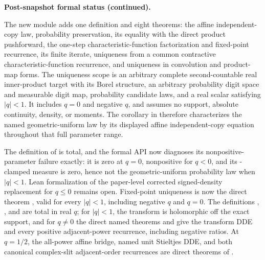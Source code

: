\documentclass[11pt]{article}
\numberwithin{equation}{section}
\theoremstyle{definition}
\theoremstyle{remark}
\begin{document}
\begin{boxedremark}
\textbf{Post-snapshot formal status (continued).}

The new module  adds one definition and eight theorems:
the affine independent-copy law, probability preservation, its equality with the direct
product pushforward, the one-step characteristic-function factorization and fixed-point
recurrence, its finite iterate, uniqueness from a common contractive characteristic-function
recurrence, and uniqueness in convolution and product-map forms.  The uniqueness scope is
an arbitrary complete second-countable real inner-product target with its Borel structure,
an arbitrary probability digit space and measurable digit map, probability candidate laws,
and a real scalar satisfying \(|q|<1\).  It includes \(q=0\) and negative \(q\), and assumes
no support, absolute continuity, density, or moments.  The corollary
 in
 therefore characterizes the named geometric-uniform
law by its displayed affine independent-copy equation throughout that full parameter range.

The definition of  is total, and the formal API now diagnoses
its nonpositive-parameter failure exactly: it is zero at \(q=0\), nonpositive for \(q<0\),
and its -clamped  measure is zero, hence not the
geometric-uniform probability law when \(|q|<1\).  Lean formalization of the paper-level
corrected signed-density replacement for \(q\le0\) remains open.  Fixed-point uniqueness is
now the direct theorem
, valid for every
\(|q|<1\), including negative \(q\) and \(q=0\).  The definitions
,
, and
 are total in real \(q\); for \(|q|<1\), the transform
is holomorphic off the exact support, and for \(q\ne0\) the direct named theorems
 and
 give the transform DDE and every positive
adjacent-power recurrence, including negative ratios.  At \(q=1/2\), the all-power affine
bridge, named unit Stieltjes DDE, and both canonical complex-slit adjacent-order recurrences
are direct theorems of .


\end{boxedremark}
\end{document}
